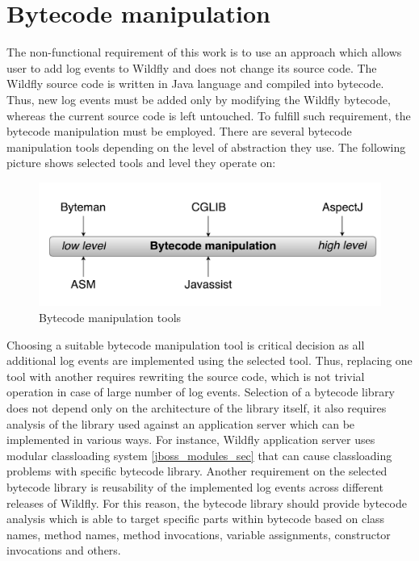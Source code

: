 \documentclass[12pt,oneside]{fithesis2}
\begin{document}
\section{Bytecode manipulation}
The non-functional requirement of this work is to use an approach which allows user to add log events to Wildfly and does not change its source code. The Wildfly source code is written in Java language and compiled into bytecode. Thus, new log events must be added only by modifying the Wildfly bytecode, whereas the current source code is left untouched. To fulfill such requirement, the bytecode manipulation must be employed. There are several bytecode manipulation tools depending on the level of abstraction they use. The following picture shows selected tools and level they operate on:
\begin{figure}[ht!]
	\centering
	\includegraphics[width=\textwidth]{images/bytecode_tools}
	\caption{Bytecode manipulation tools}
	\label{bytecode_tools}
\end{figure}

Choosing a suitable bytecode manipulation tool is critical decision as all additional log events are implemented using the selected tool. Thus, replacing one tool with another requires rewriting the source code, which is not trivial operation in case of large number of log events. Selection of a bytecode library does not depend only on the architecture of the library itself, it also requires analysis of the library used against an application server which can be implemented in various ways. For instance, Wildfly application server uses modular classloading system \ref{jboss_modules_sec} that can cause classloading problems with specific bytecode library. Another requirement on the selected bytecode library is reusability of the implemented log events across different releases of Wildfly. For this reason, the bytecode library should provide bytecode analysis which is able to target specific parts within bytecode based on class names, method names, method invocations, variable assignments, constructor invocations and others.
\end{document}

